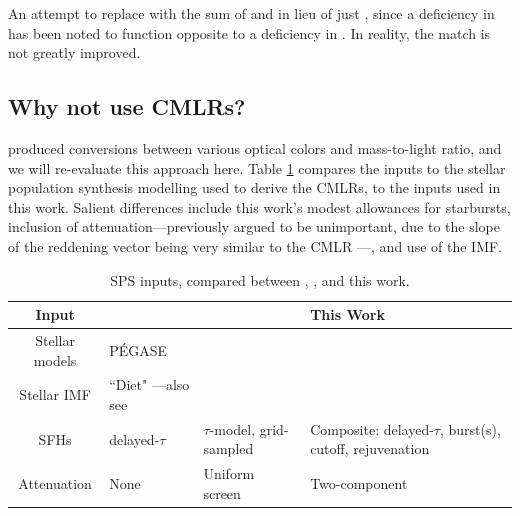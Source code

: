 An attempt to replace \HdeltaA with the sum of \HdeltaA and \HgammaA in lieu of just \HdeltaA, since a deficiency in \HgammaA has been noted to function opposite to a deficiency in \HdeltaA. In reality, the match is not greatly improved.

\subsection{Why not use CMLRs?}
\label{chap1:subsec:cmlrs}

\citet{bell_03} produced conversions between various optical colors and mass-to-light ratio, and we will re-evaluate this approach here. Table \ref{tab:bell_vs_here} compares the inputs to the stellar population synthesis modelling used to derive the \citet{bell_03} CMLRs, to the inputs used in this work. Salient differences include this work's modest allowances for starbursts, inclusion of attenuation---previously argued to be unimportant, due to the slope of the reddening vector being very similar to the CMLR \citep{bell_dejong_01, bell_03}---, and use of the \citet{kroupa_imf_01} IMF.

\begin{table}
    \centering
    \begin{tabular}{||c||p{1.5in}|p{1.5in}|p{1.5in}||} \hline
        Input & \citet{bell_03} & \citet{taylor_gama_cmlrs} & This Work \\ \hline 
        Stellar models & P\'{E}GASE \citep{fioc_97_pegase} & \citet{BC03} & \citet{fsps_c3k} \\ \hline 
        Stellar IMF & ``Diet" \citet{salpeter_imf_55}---also see \citet{bell_dejong_01} & \citet{chabrier03} & \citet{kroupa_imf_01} \\ \hline 
        SFHs & delayed-$\tau$ & $\tau$-model, grid-sampled & Composite: delayed-$\tau$, burst(s), cutoff, rejuvenation \\ \hline 
        Attenuation & None & Uniform screen & Two-component \citep{charlot_fall_00} \\ \hline 
    \end{tabular}
    \caption[Population synthesis inputs of this work, compared to previous]{\fixspacing SPS inputs, compared between \citet{bell_03}, \citet{taylor_gama_cmlrs}, and this work.}
    \label{tab:bell_vs_here}
\end{table}

